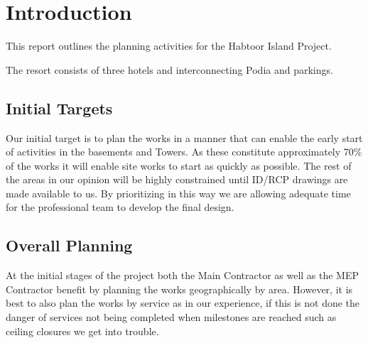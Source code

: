 \chapter{Introduction}

This report outlines the planning activities for the Habtoor Island Project.

The resort consists of three hotels and interconnecting Podia and parkings.

\section{Initial Targets}

Our initial target is to plan the works in a manner that can enable the early start of activities in the basements and Towers. As these constitute approximately 70\%  of the works it will enable site works to start as quickly as possible. The rest of the areas in our opinion will be highly constrained until ID/RCP drawings are made available to us. By prioritizing in this way we are allowing adequate time for the professional team to develop the final design.

\section{Overall Planning}

At the initial stages of the project both the Main Contractor as well as the MEP Contractor benefit by planning the works geographically by area. However, it is best to also plan the works by service as in our experience, if this is not done the danger of services not being completed when milestones are reached such as ceiling closures we get into trouble.